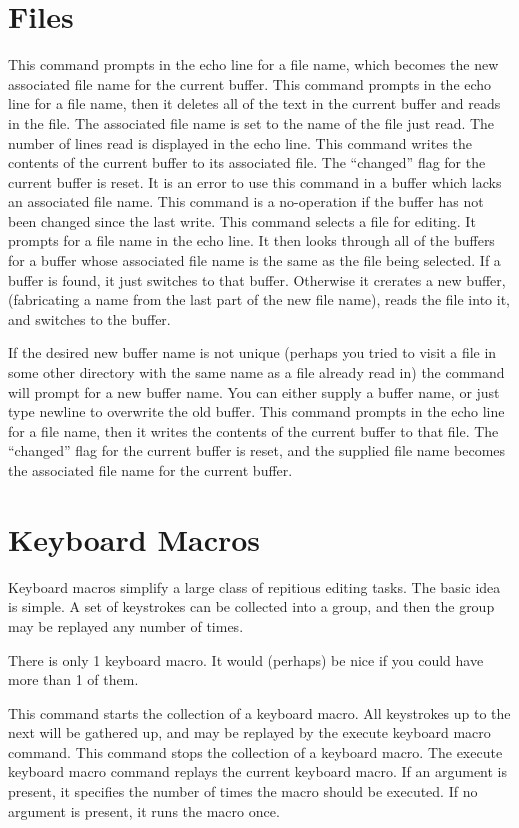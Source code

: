 \section{Files}
\begin{cmdlist}
This command prompts in the echo line for a file name,
which becomes the new associated file name for the current buffer.
This command prompts in the echo line for a file name,
then it deletes all of the text in the current buffer and reads in the
file. The associated file name is set to the name of the file just
read. The number of lines read is displayed in the echo line.
This command writes the contents of the current buffer
to its associated file. The ``changed'' flag for the current buffer is
reset. It is an error to use this command in a buffer which lacks
an associated file name. This command is a no-operation if the
buffer has not been changed since the last write.
This command selects a file for editing. It prompts for
a file name in the echo line. It then looks through all of the buffers
for a buffer whose associated file name is the same as the file being
selected. If a buffer is found, it just switches to that buffer.
Otherwise it crerates a new buffer, (fabricating a name from the last
part of the new file name), reads the file into it, and switches to the
buffer.

If the desired new buffer name is not unique (perhaps you tried to
visit a file in some other directory with the same name as a file already
read in) the command will prompt for a new buffer name. You can either
supply a buffer name, or just type newline to overwrite the old
buffer.
This command prompts in the echo line for a file name,
then it writes the contents of the current buffer to that file. The
``changed'' flag for the current buffer is reset, and the supplied file
name becomes the associated file name for the current buffer.
\end{cmdlist}
\section{Keyboard Macros}
Keyboard macros simplify a large class of repitious editing tasks.
The basic idea is simple. A set of keystrokes can be collected into a
group, and then the group may be replayed any number of times.

There is only 1 keyboard macro. It would (perhaps) be nice if you could
have more than 1 of them.
\begin{cmdlist}
This command starts the collection of a keyboard macro. All
keystrokes up to the next  will be gathered up,
and may be replayed by
the execute keyboard macro command.
This command stops the collection of a keyboard macro.
The execute keyboard macro command replays the current keyboard
macro. If an argument is present, it specifies the number of times the macro
should be executed. If no argument is present, it runs the macro once.
\end{cmdlist}
